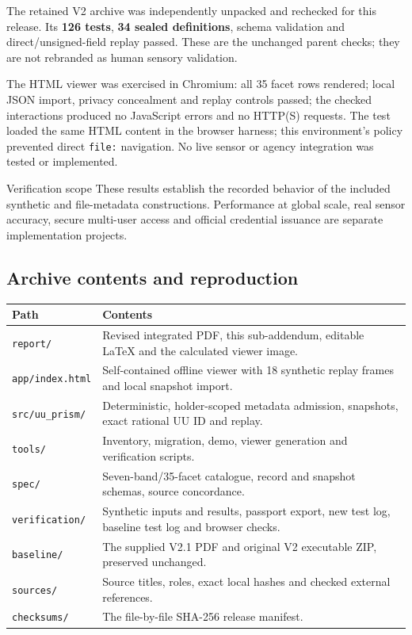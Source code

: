 \documentclass[11pt,a4paper]{article}
\newcommand{\newpagehead}[1]{\clearpage\subsection{#1}}
\begin{document}
The retained V2 archive was independently unpacked and rechecked for this release. Its \textbf{126 tests}, \textbf{34 sealed definitions}, schema validation and direct/unsigned-field replay passed. These are the unchanged parent checks; they are not rebranded as human sensory validation.

The HTML viewer was exercised in Chromium: all 35 facet rows rendered; local JSON import, privacy concealment and replay controls passed; the checked interactions produced no JavaScript errors and no HTTP(S) requests. The test loaded the same HTML content in the browser harness; this environment's policy prevented direct \texttt{file:} navigation. No live sensor or agency integration was tested or implemented.

\begin{note}{Verification scope}
These results establish the recorded behavior of the included synthetic and file-metadata constructions. Performance at global scale, real sensor accuracy, secure multi-user access and official credential issuance are separate implementation projects.
\end{note}

\newpagehead{Archive contents and reproduction}
\begin{center}\small\begin{tabularx}{\textwidth}{@{}p{}X@{}}\toprule
\textbf{Path} & \textbf{Contents}\\\midrule
\texttt{report/} & Revised integrated PDF, this sub-addendum, editable LaTeX and the calculated viewer image.\\[5pt]
\texttt{app/index.html} & Self-contained offline viewer with 18 synthetic replay frames and local snapshot import.\\[5pt]
\texttt{src/uu\_prism/} & Deterministic, holder-scoped metadata admission, snapshots, exact rational UU ID and replay.\\[5pt]
\texttt{tools/} & Inventory, migration, demo, viewer generation and verification scripts.\\[5pt]
\texttt{spec/} & Seven-band/35-facet catalogue, record and snapshot schemas, source concordance.\\[5pt]
\texttt{verification/} & Synthetic inputs and results, passport export, new test log, baseline test log and browser checks.\\[5pt]
\texttt{baseline/} & The supplied V2.1 PDF and original V2 executable ZIP, preserved unchanged.\\[5pt]
\texttt{sources/} & Source titles, roles, exact local hashes and checked external references.\\[5pt]
\texttt{checksums/} & The file-by-file SHA-256 release manifest.\\\bottomrule
\end{tabularx}\end{center}
\end{document}
